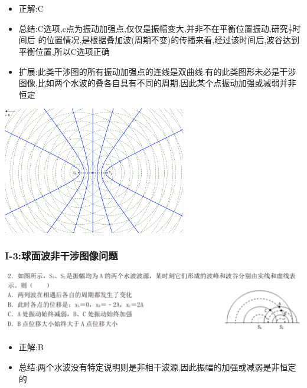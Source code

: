 \documentclass{article}
\begin{document}
\begin{itemize}
    \item 正解:\quad C
    \item 总结:\quad C选项,c点为振动加强点,仅仅是振幅变大,并非不在平衡位置振动,研究$\frac{1}{T}$时间后
          的位置情况,是根据叠加波(周期不变)的传播来看,经过该时间后,波谷达到平衡位置,所以C选项正确
    \item 扩展:\quad 此类干涉图的所有振动加强点的连线是双曲线.有的此类图形未必是干涉图像,比如两个水波的叠各自具有不同的周期,因此某个点振动加强或减弱并非恒定
\end{itemize}

\begin{center}
    \includegraphics[width = 0.6\textwidth]{./pictures/2.1-2.png}
\end{center}

\vspace{2em}

\subsubsection{I-3:球面波非干涉图像问题}
\includegraphics[width = 50em]{./pictures/2.1-6.png}

\begin{itemize}
    \item 正解:\quad B
    \item 总结:\quad 两个水波没有特定说明则是非相干波源,因此振幅的加强或减弱是非恒定的
\end{itemize}

\vspace{2em}
\end{document}
